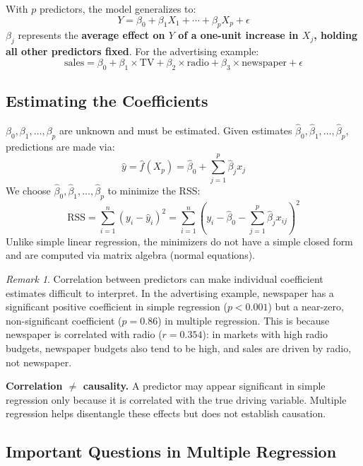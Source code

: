 \documentclass[11pt,a4paper]{article}
\theoremstyle{definition}
\theoremstyle{plain}
\theoremstyle{remark}
\newtheorem*{remark}{Remark}
\begin{document}
With $p$ predictors, the model generalizes to:
\[
    Y = \beta_0 + \beta_1 X_1 + \cdots + \beta_p X_p + \epsilon
\]
$\beta_j$ represents the \textbf{average effect on $Y$ of a one-unit increase in $X_j$, holding all other predictors fixed}. For the advertising example:
\[
    \text{sales} = \beta_0 + \beta_1 \times \text{TV} + \beta_2 \times \text{radio} + \beta_3 \times \text{newspaper} + \epsilon
\]

\subsection{Estimating the Coefficients}

$\beta_0, \beta_1, \ldots, \beta_p$ are unknown and must be estimated. Given estimates $\hat{\beta}_0, \hat{\beta}_1, \ldots, \hat{\beta}_p$, predictions are made via:
\[
    \hat{y} = \hat{f}(X_p) = \hat{\beta}_0 + \sum_{j=1}^{p} \hat{\beta}_j x_j
\]
We choose $\hat{\beta}_0, \hat{\beta}_1, \ldots, \hat{\beta}_p$ to minimize the RSS:
\[
    \mathrm{RSS} = \sum_{i=1}^{n}(y_i - \hat{y}_i)^2 = \sum_{i=1}^{n}\!\left(y_i - \hat{\beta}_0 - \sum_{j=1}^{p}\hat{\beta}_j x_{ij}\right)^{\!2}
\]
Unlike simple linear regression, the minimizers do not have a simple closed form and are computed via matrix algebra (normal equations).

\begin{remark}
Correlation between predictors can make individual coefficient estimates difficult to interpret. In the advertising example, newspaper has a significant positive coefficient in simple regression ($p < 0.001$) but a near-zero, non-significant coefficient ($p = 0.86$) in multiple regression. This is because newspaper is correlated with radio ($r = 0.354$): in markets with high radio budgets, newspaper budgets also tend to be high, and sales are driven by radio, not newspaper.
\end{remark}

\begin{tcolorbox}[colback=orange!5!white,colframe=orange!75!black]
\textbf{Correlation $\neq$ causality.} A predictor may appear significant in simple regression only because it is correlated with the true driving variable. Multiple regression helps disentangle these effects but does not establish causation.
\end{tcolorbox}

\subsection{Important Questions in Multiple Regression}
\end{document}
